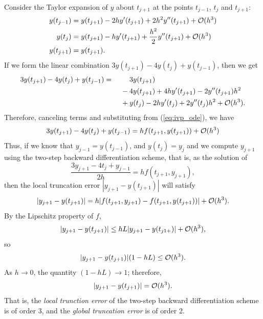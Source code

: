 \documentclass{homework}
\begin{document}
	\question 
	Consider the Taylor expansion of $y$ about $t_{j+1}$ at the points $t_{j-1}$, $t_j$ and $t_{j+1}$:
	\begin{align}
		y(t_{j-1}) &= y(t_{j+1}) - 2hy'(t_{j+1}) + 2h^2y''(t_{j+1}) + \mathcal{O}(h^3) \\
		y(t_j) &= y(t_{j+1}) - hy'(t_{j+1}) + \frac{h^2}{2}y''(t_{j+1}) + \mathcal{O}(h^3) \\
		y(t_{j+1}) &= y(t_{j+1}).
	\end{align}
	If we form the linear combination $3y(t_{j+1}) - 4y(t_j) + y(t_{j-1})$, then we get
	\begin{alignat}{2}
		3y(t_{j+1}) - 4y(t_j) + y(t_{j-1}) &{}={} &&3y(t_{j+1})\\
		&& {}-{} &4y(t_{j+1}) + 4hy'(t_{j+1}) - 2y''(t_{j+1})h^2 \\
		&&{}+{}&y(t_j)-2hy'(t_j) + 2y''(t_j)h^2 + \mathcal{O}(h^3).
	\end{alignat}
	Therefore, canceling terms and substituting from (\ref{eq:ivp_ode}), we have
	\begin{equation}
		3y(t_{j+1}) - 4y(t_j) + y(t_{j-1}) = hf(t_{j+1}, y(t_{j+1})) + \mathcal{O}(h^3)
	\end{equation}
	Thus, if we know that $y_{j-1} = y(t_{j-1})$, and $y(t_j) = y_j$ and we compute $y_{j+1}$ using the two-step backward differentiation scheme, that is, as the solution of
	\begin{equation}
		\label{p2:eq:2_step_backward}
		\frac{3y_{j+1} -4t_j + y_{j-1}}{2h} = hf(t_{j+1},y_{j+1}),
	\end{equation}
	then the local truncation error $|y_{j+1} - y(t_{j+1})|$ will satisfy
	\begin{equation}
		|y_{j+1} - y(t_{j+1})| = h|f(t_{j+1}, y_{j+1}) - f(t_{j+1}, y(t_{j+1}))| + \mathcal{O}(h^3).
	\end{equation}
	By the Lipschitz property of $f$,
	\begin{equation}
		|y_{j+1} - y(t_{j+1})| \le hL|y_{j+1}-y(t_{j1+})| + \mathcal{O}(h^3),
	\end{equation}
	so
	\begin{equation}
		|y_{j+1} - y(t_{j+1})|(1-hL) \le \mathcal{O}(h^3).
	\end{equation}
	As $h \to 0$, the quantity $(1-hL) \to 1$; therefore,
	\begin{equation}
		|y_{j+1} - y(t_{j+1})| = \mathcal{O}(h^3).
	\end{equation}
	That is, the \textit{local trunction error} of the two-step backward differentiation scheme is of order 3, and the \textit{global truncation error} is of order 2.
	
\end{document}
